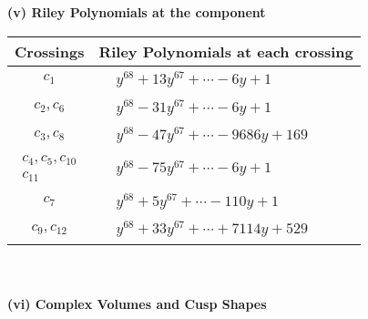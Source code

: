 \documentclass[1p]{elsarticle_modified}
\theoremstyle{definition}
\begin{document}
\newpage\renewcommand{\arraystretch}{1}
\flushleft \textbf{(v) Riley Polynomials at the component}\newline \\
\begin{tabular}{m{50pt}|m{274pt}}
Crossings & \hspace{64pt}Riley Polynomials at each crossing \\
\hline $$\begin{aligned}c_{1}\end{aligned}$$&$\begin{aligned}
&y^{68}+13 y^{67}+\cdots-6 y+1
\end{aligned}$\\
\hline $$\begin{aligned}c_{2},c_{6}\end{aligned}$$&$\begin{aligned}
&y^{68}-31 y^{67}+\cdots-6 y+1
\end{aligned}$\\
\hline $$\begin{aligned}c_{3},c_{8}\end{aligned}$$&$\begin{aligned}
&y^{68}-47 y^{67}+\cdots-9686 y+169
\end{aligned}$\\
\hline $$\begin{aligned}c_{4},c_{5},c_{10}\\c_{11}\end{aligned}$$&$\begin{aligned}
&y^{68}-75 y^{67}+\cdots-6 y+1
\end{aligned}$\\
\hline $$\begin{aligned}c_{7}\end{aligned}$$&$\begin{aligned}
&y^{68}+5 y^{67}+\cdots-110 y+1
\end{aligned}$\\
\hline $$\begin{aligned}c_{9},c_{12}\end{aligned}$$&$\begin{aligned}
&y^{68}+33 y^{67}+\cdots+7114 y+529
\end{aligned}$\\
\hline
\end{tabular}\\~\\
\newpage\flushleft \textbf{(vi) Complex Volumes and Cusp Shapes}
\end{document}
